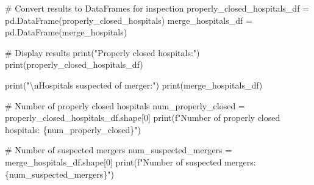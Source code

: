 \documentclass[
  letterpaper,
  DIV=11,
  numbers=noendperiod]{scrartcl}
\newenvironment{Shaded}{\begin{snugshade}}{\end{snugshade}}
\newcommand{\BuiltInTok}[1]{\textcolor[rgb]{0.00,0.23,0.31}{#1}}
\newcommand{\CharTok}[1]{\textcolor[rgb]{0.13,0.47,0.30}{#1}}
\newcommand{\CommentTok}[1]{\textcolor[rgb]{0.37,0.37,0.37}{#1}}
\newcommand{\DecValTok}[1]{\textcolor[rgb]{0.68,0.00,0.00}{#1}}
\newcommand{\NormalTok}[1]{\textcolor[rgb]{0.00,0.23,0.31}{#1}}
\newcommand{\OperatorTok}[1]{\textcolor[rgb]{0.37,0.37,0.37}{#1}}
\newcommand{\SpecialCharTok}[1]{\textcolor[rgb]{0.37,0.37,0.37}{#1}}
\newcommand{\SpecialStringTok}[1]{\textcolor[rgb]{0.13,0.47,0.30}{#1}}
\newcommand{\StringTok}[1]{\textcolor[rgb]{0.13,0.47,0.30}{#1}}
\begin{document}
\begin{Shaded}
\begin{Highlighting}[]
\CommentTok{\# Convert results to DataFrames for inspection}
\NormalTok{properly\_closed\_hospitals\_df }\OperatorTok{=}\NormalTok{ pd.DataFrame(properly\_closed\_hospitals)}
\NormalTok{merge\_hospitals\_df }\OperatorTok{=}\NormalTok{ pd.DataFrame(merge\_hospitals)}

\CommentTok{\# Display results}
\BuiltInTok{print}\NormalTok{(}\StringTok{"Properly closed hospitals:"}\NormalTok{)}
\BuiltInTok{print}\NormalTok{(properly\_closed\_hospitals\_df)}

\BuiltInTok{print}\NormalTok{(}\StringTok{"}\CharTok{\textbackslash{}n}\StringTok{Hospitals suspected of merger:"}\NormalTok{)}
\BuiltInTok{print}\NormalTok{(merge\_hospitals\_df)}

\CommentTok{\# Number of properly closed hospitals}
\NormalTok{num\_properly\_closed }\OperatorTok{=}\NormalTok{ properly\_closed\_hospitals\_df.shape[}\DecValTok{0}\NormalTok{]}
\BuiltInTok{print}\NormalTok{(}\SpecialStringTok{f"Number of properly closed hospitals: }\SpecialCharTok{\{}\NormalTok{num\_properly\_closed}\SpecialCharTok{\}}\SpecialStringTok{"}\NormalTok{)}

\CommentTok{\# Number of suspected mergers}
\NormalTok{num\_suspected\_mergers }\OperatorTok{=}\NormalTok{ merge\_hospitals\_df.shape[}\DecValTok{0}\NormalTok{]}
\BuiltInTok{print}\NormalTok{(}\SpecialStringTok{f"Number of suspected mergers: }\SpecialCharTok{\{}\NormalTok{num\_suspected\_mergers}\SpecialCharTok{\}}\SpecialStringTok{"}\NormalTok{)}
\end{Highlighting}
\end{Shaded}
\end{document}
